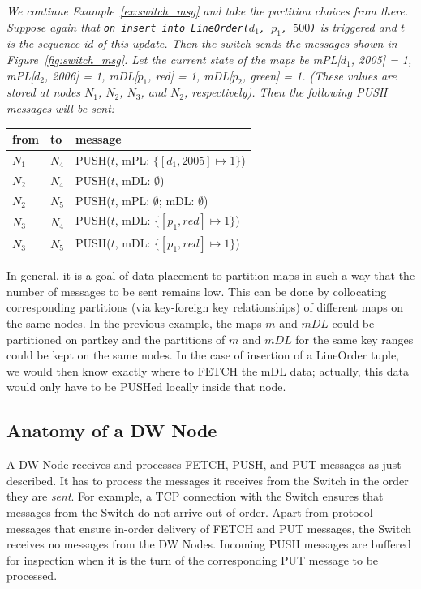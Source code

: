 \begin{example}\em
\label{ex:switch_msg2}
We continue Example~\ref{ex:switch_msg} and take the partition choices
from there.
Suppose again that
{\tt on insert into LineOrder($d_1$, $p_1$, $500$)} is triggered and $t$ is
the sequence id of this update.
Then the switch sends the messages shown in Figure~\ref{fig:switch_msg}.
%
Let the current state of the maps be
mPL[$d_1$, 2005] = 1, mPL[$d_2$, 2006] = 1, mDL[$p_1$, red] = 1,
mDL[$p_2$, green] = 1. (These values are stored at nodes
$N_1$, $N_2$, $N_3$, and $N_2$, respectively).
Then the following PUSH messages will be sent:
\begin{center}
\begin{tabular}{ll|l}
from & to & message \\
\hline
$N_1$ & $N_4$ & PUSH($t$, mPL: $\{ [d_1, 2005] \mapsto 1 \}$) \\
$N_2$ & $N_4$ & PUSH($t$, mDL: $\emptyset$) \\
$N_2$ & $N_5$ & PUSH($t$, mPL: $\emptyset$; mDL: $\emptyset$) \\
$N_3$ & $N_4$ & PUSH($t$, mDL: $\{ [p_1, red] \mapsto 1 \}$) \\
$N_3$ & $N_5$ & PUSH($t$, mDL: $\{ [p_1, red] \mapsto 1 \}$) \\
\end{tabular}
\end{center}
\end{example}


In general, it is a goal of data placement
to partition maps in such a way that the number of
messages to be sent remains low. This can be done by collocating
corresponding partitions (via key-foreign key relationships)
of different maps on the same nodes.
In the previous example, the maps $m$ and $mDL$
could be partitioned on partkey and the partitions of $m$ and $mDL$ for the
same key ranges could be kept on the same nodes.
In the case of insertion of a LineOrder tuple, we would then know exactly
where to FETCH the mDL data; actually, this data would only have to be
PUSHed locally inside that node.


\subsection{Anatomy of a DW Node}


A DW Node receives and processes FETCH, PUSH, and PUT messages
as just described.
It has to process the messages it receives from the Switch 
in the order they are {\em sent}\/. For example, a
TCP connection with the Switch ensures that messages from the 
Switch do not arrive out of order. Apart from protocol messages
that ensure in-order delivery of FETCH and PUT messages, the Switch receives no
messages from the DW Nodes.
Incoming PUSH messages are buffered for inspection when it is the turn of
the corresponding PUT message to be processed.

